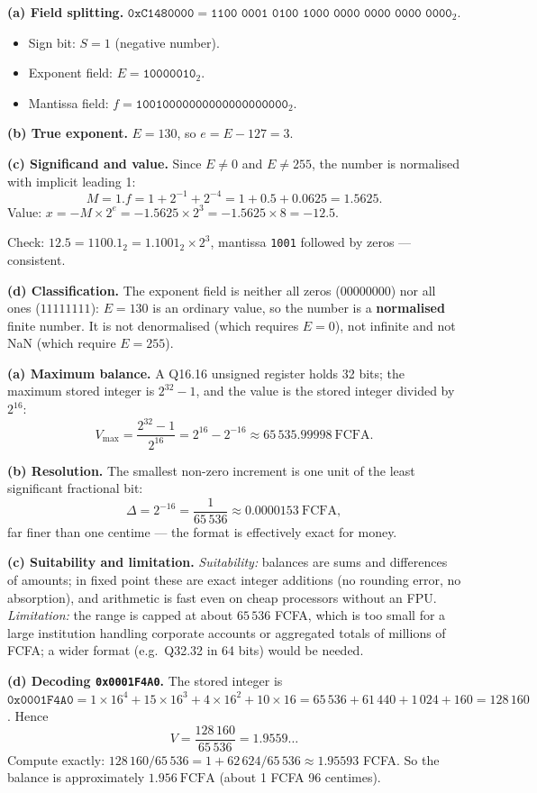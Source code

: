 \documentclass[11pt]{article}
\begin{document}
\begin{corrige}
\textbf{(a) Field splitting.} $\texttt{0xC1480000} = \texttt{1100 0001 0100 1000 0000 0000 0000 0000}_2$.
\begin{itemize}
\item Sign bit: $S = 1$ (negative number).
\item Exponent field: $E = \texttt{10000010}_2$.
\item Mantissa field: $f = \texttt{10010000000000000000000}_2$.
\end{itemize}
\textbf{(b) True exponent.} $E = 130$, so $e = E - 127 = 3$.

\textbf{(c) Significand and value.} Since $E \neq 0$ and $E \neq 255$, the number is normalised with implicit leading 1:
\[ M = 1.f = 1 + 2^{-1} + 2^{-4} = 1 + 0.5 + 0.0625 = 1.5625 . \]
Value: $x = -M\times 2^{e} = -1.5625\times 2^{3} = -1.5625\times 8 = \boxed{-12.5}$.

Check: $12.5 = 1100.1_2 = 1.1001_2\times 2^{3}$, mantissa \texttt{1001} followed by zeros — consistent.

\textbf{(d) Classification.} The exponent field is neither all zeros ($00000000$) nor all ones ($11111111$): $E = 130$ is an ordinary value, so the number is a \textbf{normalised} finite number. It is not denormalised (which requires $E=0$), not infinite and not NaN (which require $E = 255$).
\end{corrige}

\begin{corrige}
\textbf{(a) Maximum balance.} A Q16.16 unsigned register holds 32 bits; the maximum stored integer is $2^{32}-1$, and the value is the stored integer divided by $2^{16}$:
\[ V_{\max} = \frac{2^{32}-1}{2^{16}} = 2^{16} - 2^{-16} \approx 65\,535.99998\ \mathrm{FCFA}. \]

\textbf{(b) Resolution.} The smallest non-zero increment is one unit of the least significant fractional bit:
\[ \Delta = 2^{-16} = \frac{1}{65\,536} \approx 0.0000153\ \mathrm{FCFA}, \]
far finer than one centime — the format is effectively exact for money.

\textbf{(c) Suitability and limitation.} \emph{Suitability:} balances are sums and differences of amounts; in fixed point these are exact integer additions (no rounding error, no absorption), and arithmetic is fast even on cheap processors without an FPU. \emph{Limitation:} the range is capped at about $65\,536$ FCFA, which is too small for a large institution handling corporate accounts or aggregated totals of millions of FCFA; a wider format (e.g.\ Q32.32 in 64 bits) would be needed.

\textbf{(d) Decoding \texttt{0x0001F4A0}.} The stored integer is $\texttt{0x0001F4A0} = 1\times 16^{4} + 15\times 16^{3} + 4\times 16^{2} + 10\times 16 = 65\,536 + 61\,440 + 1\,024 + 160 = 128\,160$. Hence
\[ V = \frac{128\,160}{65\,536} = 1.9559\ldots \]
Compute exactly: $128\,160 / 65\,536 = 1 + 62\,624/65\,536 \approx 1.95593$ FCFA. So the balance is approximately $\boxed{1.956\ \mathrm{FCFA}}$ (about 1 FCFA 96 centimes).
\end{corrige}
\end{document}
